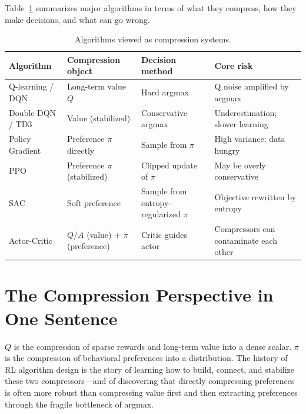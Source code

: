 Table~\ref{tab:compression} summarizes major algorithms in terms of what they
compress, how they make decisions, and what can go wrong.

\begin{table}[ht]
\centering
\caption{Algorithms viewed as compression systems.}
\label{tab:compression}
\begin{tabular}{@{}llll@{}}
\toprule
\textbf{Algorithm} & \textbf{Compression object} &
\textbf{Decision method} & \textbf{Core risk} \\
\midrule
Q-learning / DQN &
  Long-term value $Q$ &
  Hard argmax &
  Q noise amplified by argmax \\
Double DQN / TD3 &
  Value (stabilized) &
  Conservative argmax &
  Underestimation; slower learning \\
Policy Gradient &
  Preference $\pi$ directly &
  Sample from $\pi$ &
  High variance; data hungry \\
PPO &
  Preference $\pi$ (stabilized) &
  Clipped update of $\pi$ &
  May be overly conservative \\
SAC &
  Soft preference &
  Sample from entropy-regularized $\pi$ &
  Objective rewritten by entropy \\
Actor-Critic &
  $Q/A$ (value) + $\pi$ (preference) &
  Critic guides actor &
  Compressors can contaminate each other \\
\bottomrule
\end{tabular}
\end{table}


\section{The Compression Perspective in One Sentence}
\label{sec:compression-summary}

\begin{keyidea}
$Q$ is the compression of sparse rewards and long-term value into a dense
scalar.  $\pi$ is the compression of behavioral preferences into a
distribution.  The history of RL algorithm design is the story of learning how
to build, connect, and stabilize these two compressors---and of discovering
that directly compressing preferences is often more robust than compressing
value first and then extracting preferences through the fragile bottleneck of
argmax.
\end{keyidea}
